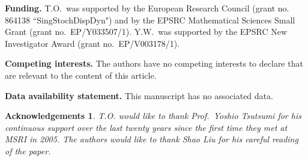 \documentclass[%
11pt,  reqno]{amsart}
\newcommand{\1}{\hspace{0.2mm}\text{I}\hspace{0.2mm}}
\newcommand{\noi}{\noindent}
\newtheorem*{ackno}{Acknowledgements}
\numberwithin{equation}{section}
\numberwithin{theorem}{section}
\begin{document}
\noi
{\bf Funding.}
T.O.~was supported by the European Research Council (grant no. 864138 ``SingStochDispDyn")
and
 by the EPSRC 
Mathematical Sciences
Small Grant  (grant no.~EP/Y033507/1).
Y.W.~was supported by 
 the EPSRC New Investigator Award 
 (grant no.~EP/V003178/1).






\medskip

\noi
{\bf Competing interests.}
The authors have no competing interests to declare that are relevant to the content of this article.


\medskip

\noi
{\bf Data availability statement.}
This manuscript has no associated data.




\begin{ackno}\rm
T.O. would like to thank Prof.~Yoshio Tsutsumi 
for his continuous support over the last twenty years
since the first time they met at MSRI in 2005.
The authors would like to thank Shao Liu for his careful
reading of the paper.

\end{ackno}







%
%
\end{document}
